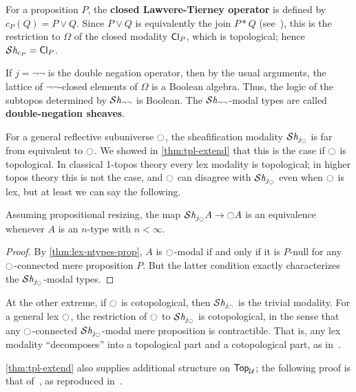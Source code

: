 \begin{eg}
  For a proposition $P$, the \textbf{closed Lawvere-Tierney operator} is defined by $c_P(Q) = P\lor Q$.
  Since $P \lor Q$ is equivalently the join $P \ast Q$ (see~\cite[Lemma 2.4]{joinconstruction}), this is the restriction to $\Omega$ of the closed modality $\mathsf{Cl}_{P}$, which is topological; hence $\mathcal{S}\mathit{h}_{c_P} = \mathsf{Cl}_{P}$.
\end{eg}

\begin{eg}\label{eg:dnsheaves}
  If $j = \neg\neg$ is the double negation operator, then by the usual arguments, the lattice of $\neg\neg$-closed elements of $\Omega$ is a Boolean algebra.
  Thus, the logic of the subtopos determined by $\mathcal{S}\mathit{h}_{\neg\neg}$ is Boolean.
  The $\mathcal{S}\mathit{h}_{\neg\neg}$-modal types are called \textbf{double-negation sheaves}.
\end{eg}

For a general reflective subuniverse ${\ocircle}$, the sheafification modality $\mathcal{S}\mathit{h}_{j_{\ocircle}}$ is far from equivalent to ${\ocircle}$.
We showed in \cref{thm:tpl-extend} that this is the case if ${\ocircle}$ is topological.
In classical 1-topos theory every lex modality is topological; in higher topos theory this is not the case, and ${\ocircle}$ can disagree with $\mathcal{S}\mathit{h}_{j_{\ocircle}}$ even when ${\ocircle}$ is lex, but at least we can say the following.

\begin{thm}\label{thm:lex-tpl}
  Assuming propositional resizing, the map $\mathcal{S}\mathit{h}_{j_{\ocircle}} A \to {\ensuremath{\ocircle}} A$ is an equivalence whenever $A$ is an $n$-type with $n<\infty$.
\end{thm}
\begin{proof}
  By \cref{thm:lex-ntypes-prop}, $A$ is ${\ocircle}$-modal if and only if it is $P$-null for any ${\ocircle}$-connected mere proposition $P$.
  But the latter condition exactly characterizes the $\mathcal{S}\mathit{h}_{j_{\ocircle}}$-modal types.
\end{proof}

At the other extreme, if ${\ocircle}$ is cotopological, then $\mathcal{S}\mathit{h}_{j_{\ocircle}}$ is the trivial modality.
For a general lex ${\ocircle}$, the restriction of ${\ocircle}$ to $\mathcal{S}\mathit{h}_{j_{\ocircle}}$ is cotopological, in the sense that any ${\ocircle}$-connected $\mathcal{S}\mathit{h}_{j_{\ocircle}}$-modal mere proposition is contractible.
That is, any lex modality ``decomposes'' into a topological part and a cotopological part, as in~\cite[Proposition 6.5.2.19]{lurie2009higher}.

\cref{thm:tpl-extend} also supplies additional structure on $\mathsf{Top}_{\mathcal{U}}$; the following proof is that of~\cite{wilson:frames}, as reproduced in~\cite[C1.1.15]{johnstone:elephant}.

